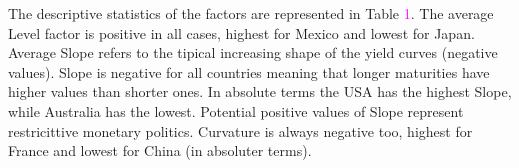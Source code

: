 \documentclass[12pt,bibliography=totoc]{article}
\begin{document}

The descriptive statistics of the factors are represented in Table \textcolor{magenta}{1}. The average Level factor is positive in all cases, highest for Mexico and lowest for Japan. Average Slope refers to the tipical increasing shape of the yield curves (negative values). Slope is negative for all countries meaning that longer maturities have higher values than shorter ones. In absolute terms the USA has the highest Slope, while Australia has the lowest. Potential positive values of Slope represent restricittive monetary politics. Curvature is always negative too, highest for France and lowest for China (in absoluter terms).
\end{document}
